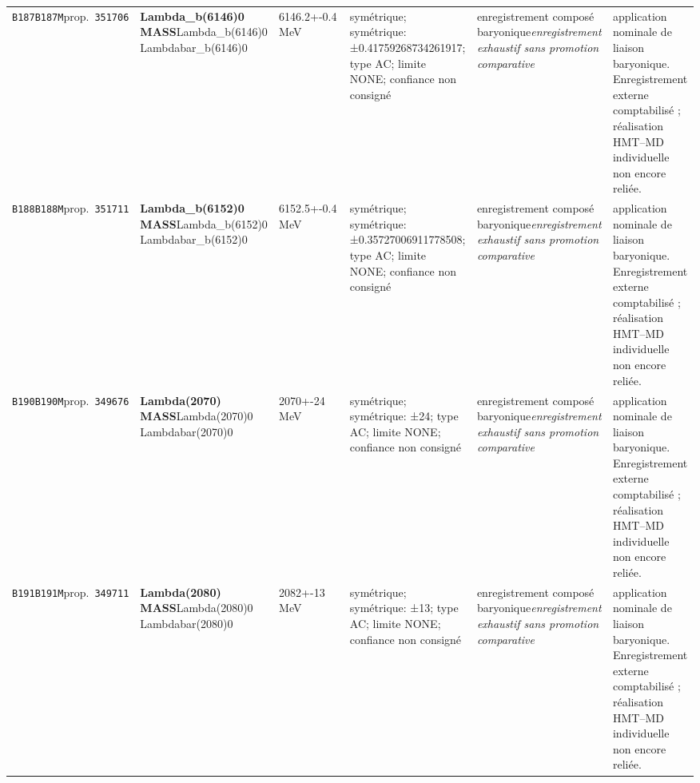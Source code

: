 \begin{landscape}
\begin{longtable}{L{1.85cm}L{4.45cm}L{2.35cm}L{4.05cm}L{3.35cm}L{7.15cm}}
\texttt{B187}\newline \texttt{B187M}\newline prop.\ \texttt{351706} & \textbf{Lambda\_\allowbreak{}b(6146)0 MASS}\newline Lambda\_\allowbreak{}b(6146)0 \textbar{}\allowbreak{} Lambdabar\_\allowbreak{}b(6146)0 & 6146.2+-0.4\,MeV & symétrique; symétrique: ±0.41759268734261917; type AC; limite NONE; confiance non consigné & enregistrement composé baryonique\newline \emph{enregistrement exhaustif sans promotion comparative} & application nominale de liaison baryonique. Enregistrement externe comptabilisé ; réalisation HMT--MD individuelle non encore reliée. \\
\texttt{B188}\newline \texttt{B188M}\newline prop.\ \texttt{351711} & \textbf{Lambda\_\allowbreak{}b(6152)0 MASS}\newline Lambda\_\allowbreak{}b(6152)0 \textbar{}\allowbreak{} Lambdabar\_\allowbreak{}b(6152)0 & 6152.5+-0.4\,MeV & symétrique; symétrique: ±0.35727006911778508; type AC; limite NONE; confiance non consigné & enregistrement composé baryonique\newline \emph{enregistrement exhaustif sans promotion comparative} & application nominale de liaison baryonique. Enregistrement externe comptabilisé ; réalisation HMT--MD individuelle non encore reliée. \\
\texttt{B190}\newline \texttt{B190M}\newline prop.\ \texttt{349676} & \textbf{Lambda(2070) MASS}\newline Lambda(2070)0 \textbar{}\allowbreak{} Lambdabar(2070)0 & 2070+-24\,MeV & symétrique; symétrique: ±24; type AC; limite NONE; confiance non consigné & enregistrement composé baryonique\newline \emph{enregistrement exhaustif sans promotion comparative} & application nominale de liaison baryonique. Enregistrement externe comptabilisé ; réalisation HMT--MD individuelle non encore reliée. \\
\texttt{B191}\newline \texttt{B191M}\newline prop.\ \texttt{349711} & \textbf{Lambda(2080) MASS}\newline Lambda(2080)0 \textbar{}\allowbreak{} Lambdabar(2080)0 & 2082+-13\,MeV & symétrique; symétrique: ±13; type AC; limite NONE; confiance non consigné & enregistrement composé baryonique\newline \emph{enregistrement exhaustif sans promotion comparative} & application nominale de liaison baryonique. Enregistrement externe comptabilisé ; réalisation HMT--MD individuelle non encore reliée. \\

\end{longtable}
\end{landscape}
